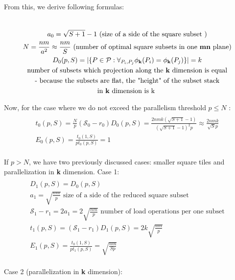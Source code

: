 \documentclass[sigplan,review,anonymous]{acmart}\settopmatter{printfolios=true,printccs=false,printacmref=false}
\begin{document}
From this, we derive following formulas:

\begin{multline}
\\
a_0 = \sqrt{S+1} - 1  \text{ (size of a side of the square subset )}\\
N = \frac{nm}{a^2} \approx \frac{nm}{S} \text{ (number of optimal square 
	subsets in one \textbf{mn} plane)}\\
D_0(p,S) = |\{P \in \mathcal{P} : \forall_{P_i, P_j} \phi_{\mathbf{k}}(P_i) = 
\phi_{\mathbf{k}}(P_j)\}| = k \\
\text{number of subsets which projection along the \textbf{k} dimension is 
	equal} \\ 
\text{- because the subsets are flat, the "height" of the 
	subset stack}
\\ 
\text{in \textbf{k} dimension is k }\\
\end{multline}

Now, for the case where we do not exceed the parallelism threshold $p \le N$ : 
\begin{multline}
\\
t_0(p,S) = \frac{N}{p} (\mathcal{S}_0 - r_0) D_0(p,S) = \frac{2nmk(\sqrt{S+1} 
	- 
	1)}{(\sqrt{S+1} - 1)^2 p} \approx \frac{2nmk}{\sqrt{S} p} \\
E_0(p,S) = \frac{t_0(1,S)}{p t_0(p,S)} = 1 \\
\end{multline}

If $p > N$, we have two previously discussed cases: smaller square tiles and 
parallelization in \textbf{k} dimension. Case 1:
\begin{multline}
\\
D_1(p,S) = D_0(p,S) \\
a_1 = \sqrt{\frac{nm}{p}} \text{ size of a side of the reduced square 
	subset} \\
\mathcal{S}_1 - r_1 = 2a_1 = 2\sqrt{\frac{nm}{p}} \text{ number of load 
	operations per one subset} \\
t_1(p,S) = (\mathcal{S}_1 - r_1) D_1(p,S) = 2k \sqrt{\frac{nm}{p}} \\
E_1(p,S) = \frac{t_0(1,S)}{p t_1(p,S)} = \sqrt{\frac{nm}{Sp}} \\
\end{multline}

Case 2 (parallelization in \textbf{k} dimension): 
\end{document}
